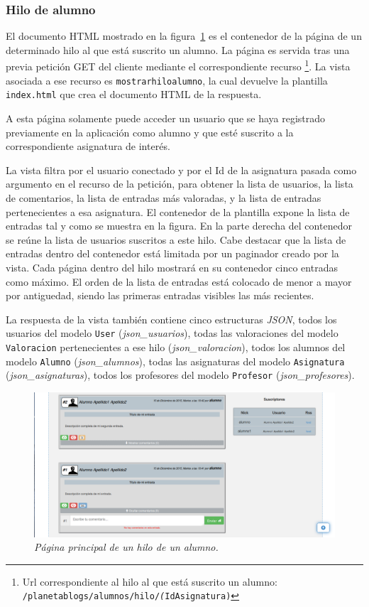 \documentclass[a4paper, 12pt]{book}
\begin{document}
\subsubsection{Hilo de alumno} 
\label{sec:hiloalumno}
El documento HTML mostrado en la figura~\ref{fig:hiloalumno} es el contenedor de la p\'agina de un determinado hilo al que est\'a suscrito un alumno. 
La p\'agina es servida tras una previa petici\'on GET del cliente mediante el correspondiente recurso \footnote{Url correspondiente al hilo al que est\'a
suscrito un alumno: \texttt{/planetablogs/alumnos/hilo/\textit(IdAsignatura)}}. La vista asociada a ese recurso es \texttt{mostrarhiloalumno}, la cual 
devuelve la plantilla \texttt{index.html} que crea el documento HTML de la respuesta.

A esta p\'agina solamente puede acceder un usuario que se haya registrado previamente en la aplicaci\'on como alumno y que est\'e suscrito a la
correspondiente asignatura de inter\'es.

La vista filtra por el usuario conectado y por el Id de la asignatura pasada como argumento en el recurso de la petici\'on, para obtener la lista de 
usuarios, la lista de comentarios, la lista de entradas m\'as valoradas, y la lista de entradas pertenecientes a esa asignatura. 
El contenedor de la plantilla expone la lista de entradas tal y como se muestra en la figura. En la parte derecha del contenedor se re\'une la lista de 
usuarios suscritos a este hilo. Cabe destacar que la lista de entradas dentro del contenedor est\'a limitada por un paginador creado por la vista. Cada 
p\'agina dentro del hilo mostrar\'a en su contenedor cinco entradas como m\'aximo. El orden de la lista de entradas est\'a colocado de menor a mayor por 
antiguedad, siendo las primeras entradas visibles las m\'as recientes.

La respuesta de la vista tambi\'en contiene cinco estructuras \textit{JSON}, todos los usuarios del modelo \texttt{User} (\textit{json\_usuarios}), 
todas las valoraciones del modelo \texttt{Valoracion} pertenecientes a ese hilo (\textit{json\_valoracion}), todos los alumnos del modelo \texttt{Alumno} 
(\textit{json\_alumnos}), todas las asignaturas del modelo \texttt{Asignatura} (\textit{json\_asignaturas}), todos los profesores del modelo \texttt{Profesor} 
(\textit{json\_profesores}).

\begin{figure}
  \centering
  \includegraphics[width=17cm, keepaspectratio]{imagenes/HiloAlumnoEntradas}
  \caption{\textit{P\'agina principal de un hilo de un alumno.}}
  \label{fig:hiloalumno}
\end{figure}
\end{document}
